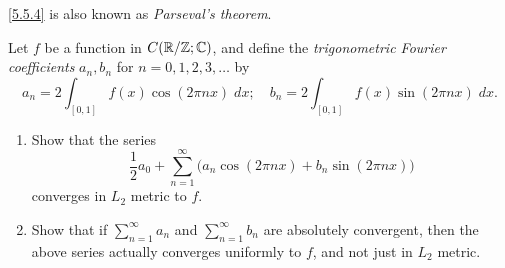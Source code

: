 \begin{note}
  \cref{5.5.4} is also known as \emph{Parseval's theorem}.
\end{note}

\exercisesection

\begin{ex}\label{ex:5.5.1}
  Let \(f\) be a function in \(C(\mathbb{R} / \mathbb{Z} ; \mathbb{C})\), and define the \emph{trigonometric Fourier coefficients} \(a_n, b_n\) for \(n = 0, 1, 2, 3, \dots\) by
  \[
    a_n = 2 \int_{[0, 1]} f(x) \cos(2 \pi n x) \; dx; \quad b_n = 2 \int_{[0, 1]} f(x) \sin(2 \pi n x) \; dx.
  \]
  \begin{enumerate}
    \item Show that the series
          \[
            \frac{1}{2} a_0 + \sum_{n = 1}^\infty \big(a_n \cos(2 \pi n x) + b_n \sin(2 \pi n x)\big)
          \]
          converges in \(L_2\) metric to \(f\).
    \item Show that if \(\sum_{n = 1}^\infty a_n\) and \(\sum_{n = 1}^\infty b_n\) are absolutely convergent, then the above series actually converges uniformly to \(f\), and not just in \(L_2\) metric.
  \end{enumerate}
\end{ex}

